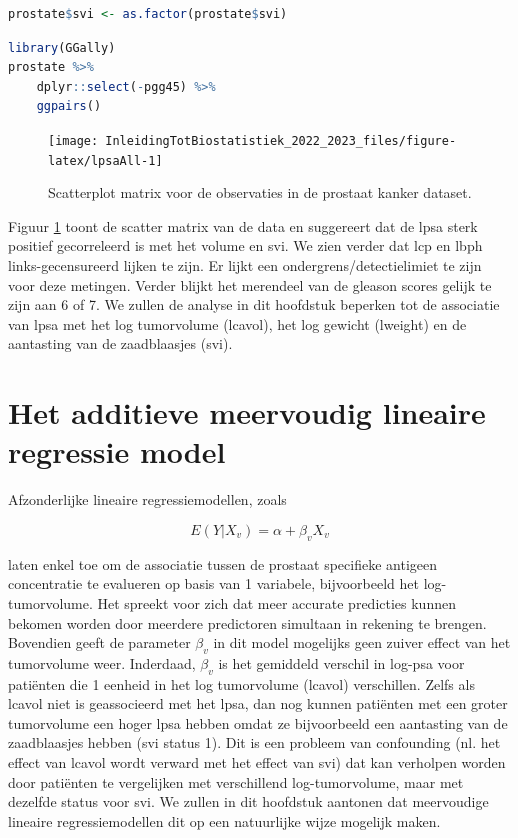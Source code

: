 \documentclass[
  12pt,dutch,coursenotes]{book}
\begin{document}
\begin{lstlisting}[language=R]
prostate$svi <- as.factor(prostate$svi)
\end{lstlisting}

\begin{lstlisting}[language=R]
library(GGally)
prostate %>%
    dplyr::select(-pgg45) %>%
    ggpairs()
\end{lstlisting}

\begin{figure}

{\centering \texttt{[image: InleidingTotBiostatistiek\_2022\_2023\_files/figure-latex/lpsaAll-1]} 

}

\caption{Scatterplot matrix voor de observaties in de prostaat kanker dataset.}\label{fig:lpsaAll}
\end{figure}

Figuur \ref{fig:lpsaAll} toont de scatter matrix van de data en suggereert dat de lpsa sterk positief gecorreleerd is met het volume en svi.
We zien verder dat lcp en lbph links-gecensureerd lijken te zijn. Er lijkt een ondergrens/detectielimiet te zijn voor deze metingen. Verder blijkt het merendeel van de gleason scores gelijk te zijn aan 6 of 7. We zullen de analyse in dit hoofdstuk beperken tot de associatie van lpsa met het log tumorvolume (lcavol), het log gewicht (lweight) en de aantasting van de zaadblaasjes (svi).

\hypertarget{het-additieve-meervoudig-lineaire-regressie-model}{%
\section{Het additieve meervoudig lineaire regressie model}\label{het-additieve-meervoudig-lineaire-regressie-model}}

Afzonderlijke lineaire regressiemodellen, zoals

\[E(Y|X_v)=\alpha+\beta_v X_v\]

laten enkel toe om de associatie tussen de prostaat specifieke antigeen concentratie te evalueren op basis van 1 variabele, bijvoorbeeld het log-tumorvolume. Het spreekt voor zich dat meer accurate predicties kunnen bekomen worden door meerdere predictoren simultaan in rekening te brengen.
Bovendien geeft de parameter \(\beta_v\) in dit model mogelijks geen zuiver effect van het tumorvolume weer. Inderdaad, \(\beta_v\) is het gemiddeld verschil in log-psa voor patiënten die 1 eenheid in het log tumorvolume (lcavol) verschillen. Zelfs als lcavol niet is geassocieerd met het lpsa, dan nog kunnen patiënten met een groter tumorvolume een hoger lpsa hebben omdat ze bijvoorbeeld een aantasting van de zaadblaasjes hebben (svi status 1). Dit is een probleem van confounding (nl. het effect van lcavol wordt verward met het effect van svi) dat kan verholpen worden door patiënten te vergelijken met verschillend log-tumorvolume, maar met dezelfde status voor svi. We zullen in dit hoofdstuk aantonen dat meervoudige lineaire regressiemodellen dit op een natuurlijke wijze mogelijk maken.
\end{document}
